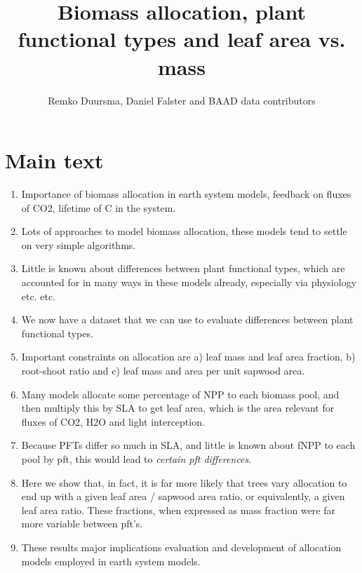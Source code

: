 \documentclass[a4paper]{article}
\begin{document}
\title{Biomass allocation, plant functional types and leaf area vs. mass}

\author{Remko Duursma, Daniel Falster and BAAD data contributors}

\maketitle



\section{Main text}

\begin{enumerate}
  \item Importance of biomass allocation in earth system models, feedback on fluxes of CO2, lifetime of C in the system.
  \item Lots of approaches to model biomass allocation, these models tend to settle on very simple algorithms.
  \item Little is known about differences between plant functional types, which are accounted for in many ways in these models already, especially via physiology etc. etc. 
  \item We now have a dataset that we can use to evaluate differences between plant functional types.
  \item Important constraints on allocation are a) leaf mass and leaf area fraction, b) root-shoot ratio and c) leaf mass and area per unit sapwood area.
  \item Many models allocate some percentage of NPP to each biomass pool, and then multiply this by SLA to get leaf area, which is the area relevant for fluxes of CO2, H2O and light interception.
  \item Because PFTs differ so much in SLA, and little is known about fNPP to each pool by pft, this would lead to \emph{certain pft differences}.
  \item Here we show that, in fact, it is far more likely that trees vary allocation to end up with a given leaf area / sapwood area ratio, or equivalently, a given leaf area ratio. These fractions, when expressed as mass fraction were far more variable between pft's.
  \item These results major implications evaluation and development of allocation models employed in earth system models.
\end{enumerate}
\end{document}
